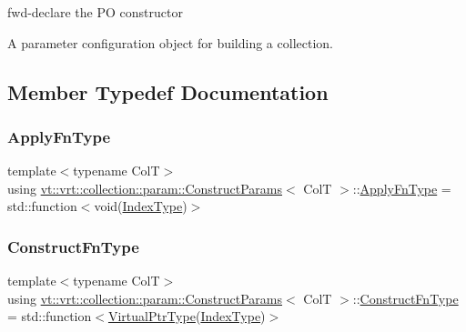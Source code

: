 fwd-\/declare the PO constructor 

A parameter configuration object for building a collection. 

\subsection{Member Typedef Documentation}
\mbox{\label{structvt_1_1vrt_1_1collection_1_1param_1_1_construct_params_a4275ecc44239ac1aeedea9d31e93c78f}} 
\subsubsection{\texorpdfstring{Apply\+Fn\+Type}{ApplyFnType}}
{\footnotesize\ttfamily template$<$typename ColT$>$ \\
using \hyperlink{structvt_1_1vrt_1_1collection_1_1param_1_1_construct_params}{vt\+::vrt\+::collection\+::param\+::\+Construct\+Params}$<$ ColT $>$\+::\hyperlink{structvt_1_1vrt_1_1collection_1_1param_1_1_construct_params_a4275ecc44239ac1aeedea9d31e93c78f}{Apply\+Fn\+Type} =  std\+::function$<$void(\hyperlink{structvt_1_1vrt_1_1collection_1_1param_1_1_construct_params_a7bc8d5d57e377e0f2e60031582eeb7e6}{Index\+Type})$>$}

\mbox{\label{structvt_1_1vrt_1_1collection_1_1param_1_1_construct_params_a7ad7bdf4220701e54b485f45e08b1736}} 
\subsubsection{\texorpdfstring{Construct\+Fn\+Type}{ConstructFnType}}
{\footnotesize\ttfamily template$<$typename ColT$>$ \\
using \hyperlink{structvt_1_1vrt_1_1collection_1_1param_1_1_construct_params}{vt\+::vrt\+::collection\+::param\+::\+Construct\+Params}$<$ ColT $>$\+::\hyperlink{structvt_1_1vrt_1_1collection_1_1param_1_1_construct_params_a7ad7bdf4220701e54b485f45e08b1736}{Construct\+Fn\+Type} =  std\+::function$<$\hyperlink{structvt_1_1vrt_1_1collection_1_1param_1_1_construct_params_a51c2b552a29b508b728b2e903d6073b1}{Virtual\+Ptr\+Type}(\hyperlink{structvt_1_1vrt_1_1collection_1_1param_1_1_construct_params_a7bc8d5d57e377e0f2e60031582eeb7e6}{Index\+Type})$>$}

